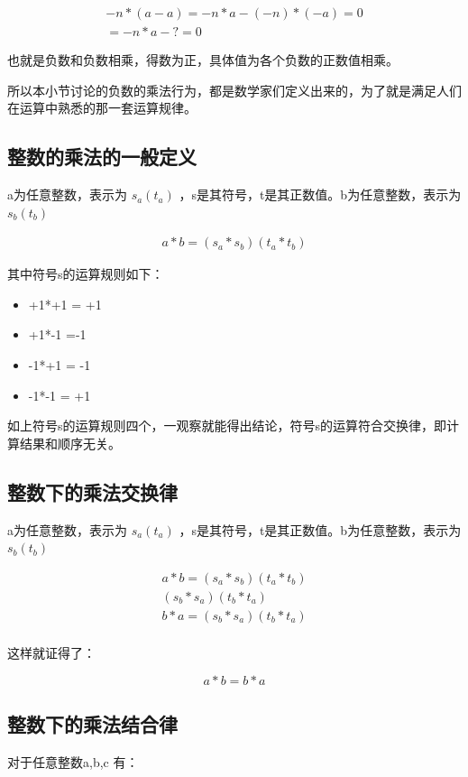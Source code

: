 \documentclass[12pt,oneside]{book}
\begin{document}
\begin{align*}
-n * (a-a) = -n * a - (-n)*(-a) =0\\
=-n*a - ? =0
\end{align*}

也就是负数和负数相乘，得数为正，具体值为各个负数的正数值相乘。

所以本小节讨论的负数的乘法行为，都是数学家们定义出来的，为了就是满足人们在运算中熟悉的那一套运算规律。

\subsection{整数的乘法的一般定义}
a为任意整数，表示为 $s_a(t_a)$ ，s是其符号，t是其正数值。b为任意整数，表示为 $s_b(t_b)$ 

\begin{align}
a * b = (s_a*s_b)(t_a*t_b)
\end{align}

其中符号s的运算规则如下：

\begin{itemize}
\item +1*+1 = +1
\item +1*-1 =-1
\item -1*+1 = -1
\item -1*-1 = +1
\end{itemize}

如上符号s的运算规则四个，一观察就能得出结论，符号s的运算符合交换律，即计算结果和顺序无关。


\subsection{整数下的乘法交换律}
a为任意整数，表示为 $s_a(t_a)$ ，s是其符号，t是其正数值。b为任意整数，表示为 $s_b(t_b)$ 

\begin{align*}
a*b =  (s_a*s_b)(t_a*t_b)\\
(s_b*s_a)(t_b*t_a)\\
b*a =  (s_b*s_a)(t_b*t_a)\\
\end{align*}

这样就证得了：

\begin{equation}
a * b = b * a
\end{equation}


\subsection{整数下的乘法结合律}
对于任意整数a,b,c 有：
\end{document}
